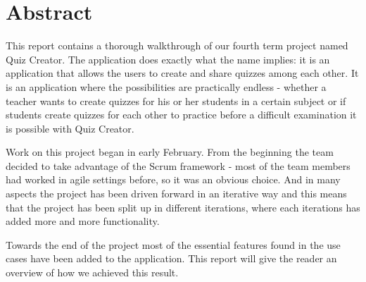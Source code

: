 \chapter*{Abstract}
This report contains a thorough walkthrough of our fourth term project named Quiz Creator. The application does exactly what the name implies: it is an application that allows the users to create and share quizzes among each other. It is an application where the possibilities are practically endless - whether a teacher wants to create quizzes for his or her students in a certain subject or if students create quizzes for each other to practice before a difficult examination it is possible with Quiz Creator. 

Work on this project began in early February. From the beginning the team decided to take advantage of the Scrum framework - most of the team members had worked in agile settings before, so it was an obvious choice. And in many aspects the project has been driven forward in an iterative way and this means that the project has been split up in different iterations, where each iterations has added more and more functionality. 

Towards the end of the project most of the essential features found in the use cases have been added to the application. This report will give the reader an overview of how we achieved this result. 